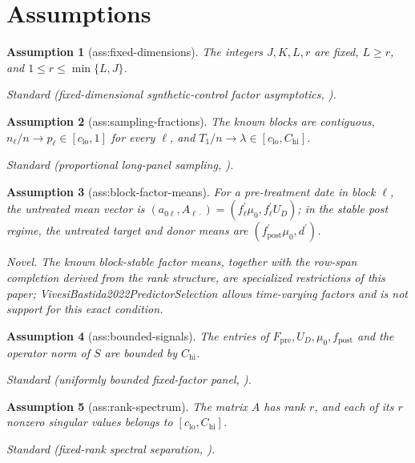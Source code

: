 \documentclass{article}
\newtheorem{assumption}{Assumption}
\begin{document}
\section{Assumptions}

\begin{assumption}[ass:fixed-dimensions]\label{ass:fixed-dimensions}
The integers \(J,K,L,r\) are fixed, \(L\ge r\), and \(1\le r\le\min\{L,J\}\).
\par\smallskip\noindent\emph{Standard} (fixed-dimensional synthetic-control factor asymptotics, \cite{Fry2024MomentsSC}).
\end{assumption}

\begin{assumption}[ass:sampling-fractions]\label{ass:sampling-fractions}
The known blocks are contiguous, \(n_\ell/n\to p_\ell\in[c_{\mathrm{lo}},1]\) for every \(\ell\), and \(T_1/n\to\lambda\in[c_{\mathrm{lo}},C_{\mathrm{hi}}]\).
\par\smallskip\noindent\emph{Standard} (proportional long-panel sampling, \cite{Fry2024MomentsSC}).
\end{assumption}

\begin{assumption}[ass:block-factor-means]\label{ass:block-factor-means}
For a pre-treatment date in block \(\ell\), the untreated mean vector is \((a_{0\ell},A_{\ell\cdot})=(f_\ell^{\prime}\mu_0,f_\ell^{\prime}U_D)\); in the stable post regime, the untreated target and donor means are \((f_{\mathrm{post}}^{\prime}\mu_0,d^{\prime})\).
\par\smallskip\noindent\emph{Novel.} The known block-stable factor means, together with the row-span completion derived from the rank structure, are specialized restrictions of this paper; VivesiBastida2022PredictorSelection allows time-varying factors and is not support for this exact condition.
\end{assumption}

\begin{assumption}[ass:bounded-signals]\label{ass:bounded-signals}
The entries of \(F_{\mathrm{pre}},U_D,\mu_0,f_{\mathrm{post}}\) and the operator norm of \(S\) are bounded by \(C_{\mathrm{hi}}\).
\par\smallskip\noindent\emph{Standard} (uniformly bounded fixed-factor panel, \cite{Fry2024MomentsSC}).
\end{assumption}

\begin{assumption}[ass:rank-spectrum]\label{ass:rank-spectrum}
The matrix \(A\) has rank \(r\), and each of its \(r\) nonzero singular values belongs to \([c_{\mathrm{lo}},C_{\mathrm{hi}}]\).
\par\smallskip\noindent\emph{Standard} (fixed-rank spectral separation, \cite{ChoiKwonLiao2024SyntheticControls}).
\end{assumption}
\end{document}
